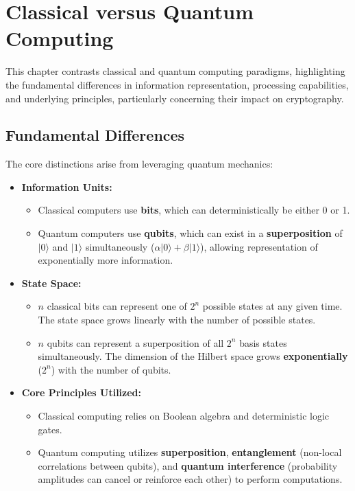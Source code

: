 \chapter{Classical versus Quantum Computing}\label{chap:classical_vs_quantum}

This chapter contrasts classical and quantum computing paradigms, highlighting the fundamental differences in information representation, processing capabilities, and underlying principles, particularly concerning their impact on cryptography.

\section{Fundamental Differences}\label{sec:differences}

The core distinctions arise from leveraging quantum mechanics:

\begin{itemize}
    \item \textbf{Information Units:}
    \begin{itemize}
        \item Classical computers use \textbf{bits}, which can deterministically be either 0 or 1.
        \item Quantum computers use \textbf{qubits}, which can exist in a \textbf{superposition} of $|0\rangle$ and $|1\rangle$ simultaneously ($\alpha|0\rangle + \beta|1\rangle$), allowing representation of exponentially more information.
    \end{itemize}
    \item \textbf{State Space:}
    \begin{itemize}
        \item $n$ classical bits can represent one of $2^n$ possible states at any given time. The state space grows linearly with the number of possible states.
        \item $n$ qubits can represent a superposition of all $2^n$ basis states simultaneously. The dimension of the Hilbert space grows \textbf{exponentially} ($2^n$) with the number of qubits.
    \end{itemize}
    \item \textbf{Core Principles Utilized:}
    \begin{itemize}
        \item Classical computing relies on Boolean algebra and deterministic logic gates.
        \item Quantum computing utilizes \textbf{superposition}, \textbf{entanglement} (non-local correlations between qubits), and \textbf{quantum interference} (probability amplitudes can cancel or reinforce each other) to perform computations.
    \end{itemize}
\end{itemize}

